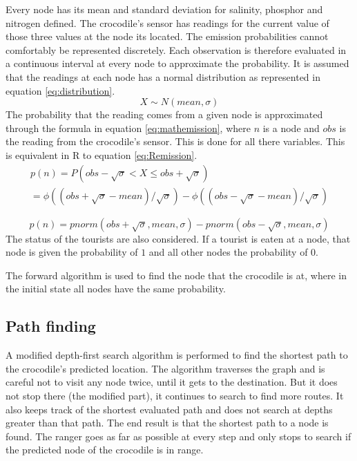 \documentclass[12pt, a4paper]{article}
\begin{document}
Every node has its mean and standard deviation for salinity, phosphor and nitrogen defined. The crocodile's sensor has readings for the current value of those three values at the node its located. The emission probabilities cannot comfortably be represented discretely. Each observation is therefore evaluated in a continuous interval at every node to approximate the probability. It is assumed that the readings at each node has a normal distribution as represented in equation \ref{eq:distribution}.
\begin{equation}\label{eq:distribution}
X \sim N(mean,\sigma)
\end{equation}
The probability that the reading comes from a given node is approximated through the formula in equation \ref{eq:mathemission}, where $n$ is a node and $obs$ is the reading from the crocodile's sensor. This is done for all there variables. This is equivalent in R to equation \ref{eq:Remission}.
\begin{equation}\label{eq:mathemission}
\begin{split}
p(n) = P(obs-\sqrt{\sigma} < X \le obs+\sqrt{\sigma}) \hspace{137pt}
\\
=\phi((obs+\sqrt{\sigma}-mean)/\sqrt{\sigma})-\phi((obs-\sqrt{\sigma}-mean)/\sqrt{\sigma})
\end{split}
\end{equation}

\begin{equation}\label{eq:Remission}
p(n) = pnorm(obs+\sqrt{\sigma},mean,\sigma)-pnorm(obs-\sqrt{\sigma},mean,\sigma)
\end{equation}
The status of the tourists are also considered. If a tourist is eaten at a node, that node is given the probability of $1$ and all other nodes the probability of $0$.

The forward algorithm is used to find the node that the crocodile is at, where in the initial state all nodes have the same probability.

\subsection{Path finding}
A modified depth-first search algorithm is performed to find the shortest path to the crocodile's predicted location. The algorithm traverses the graph and is careful not to visit any node twice, until it gets to the destination. But it does not stop there (the modified part), it continues to search to find more routes. It also keeps track of the shortest evaluated path and does not search at depths greater than that path. The end result is that the shortest path to a node is found. The ranger goes as far as possible at every step and only stops to search if the predicted node of the crocodile is in range.
\end{document}
